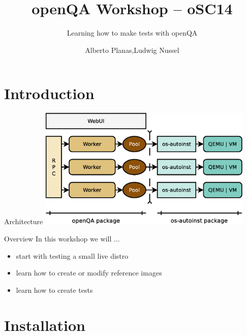 \documentclass{beamer}
\author{Alberto Planas,\newline Ludwig Nussel\newline {\tiny SUSE Linux Products GmbH}}
\title{openQA Workshop -- oSC14}
\subtitle{Learning how to make tests with openQA}
\begin{document}
\begin{frame}[t,plain]
  \titlepage
\end{frame}


\section{Introduction}
%
%
\begin{frame}{Architecture}
  \includegraphics[height=5.8cm,width=10.3cm]{arch}
\end{frame}

%
%
\begin{frame}{Overview}
  In this workshop we will ...
  \begin{itemize}
    \item start with testing a small live distro
    \item learn how to create or modify reference images
    \item learn how to create tests
  \end{itemize}
\end{frame}

\section{Installation}
%
%



%
\end{document}
